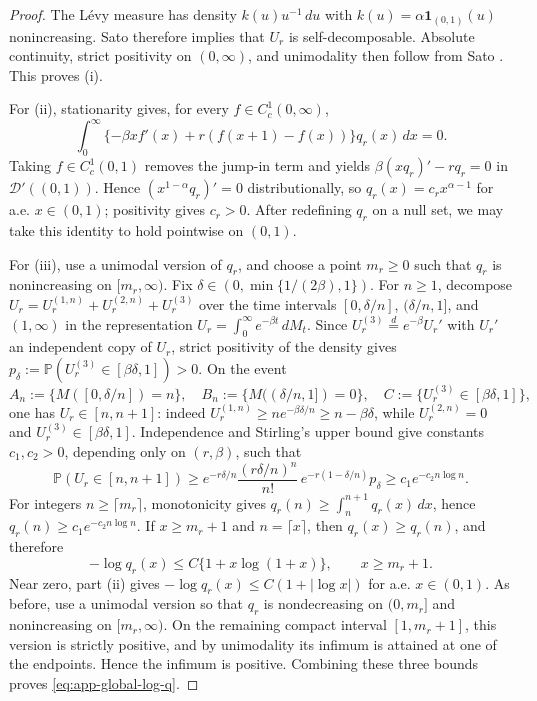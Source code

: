 \documentclass{article}
\newcommand{\Pbb}{\mathbb{P}}
\begin{document}
\begin{proof}
The L\'evy measure has density $k(u)u^{-1}\,du$ with
$k(u)=\alpha\mathbf 1_{(0,1)}(u)$ nonincreasing. Sato
\cite[Theorem~15.10 and Corollary~15.11]{sato1999levy} therefore implies
that $U_r$ is self-decomposable. Absolute continuity, strict positivity on
$(0,\infty)$, and unimodality then follow from Sato
\cite[Theorem~27.13, Lemma~53.1, and Theorem~53.1]{sato1999levy}. This proves
(i).

For (ii), stationarity gives, for every $f\in C_c^1(0,\infty)$,
\[
\int_0^\infty \{ -\beta x f'(x)+r(f(x+1)-f(x)) \}q_r(x)\,dx=0.
\]
Taking $f\in C_c^1(0,1)$ removes the jump-in term and yields
$\beta(xq_r)'-rq_r=0$ in $\mathcal D'((0,1))$. Hence
$(x^{1-\alpha}q_r)'=0$ distributionally, so
$q_r(x)=c_r x^{\alpha-1}$ for a.e. $x\in(0,1)$; positivity gives $c_r>0$.
After redefining \(q_r\) on a null set, we may take this identity to hold
pointwise on \((0,1)\).

For (iii), use a unimodal version of $q_r$, and choose a point $m_r\ge0$ such
that $q_r$ is nonincreasing on $[m_r,\infty)$. Fix
$\delta\in(0,\min\{1/(2\beta),1\})$. For $n\ge1$, decompose
$U_r=U_r^{(1,n)}+U_r^{(2,n)}+U_r^{(3)}$ over the time intervals
$[0,\delta/n]$, $(\delta/n,1]$, and $(1,\infty)$ in the representation
$U_r=\int_0^\infty e^{-\beta t}\,dM_t$. Since
$U_r^{(3)}\stackrel d=e^{-\beta}U_r'$ with $U_r'$ an independent copy of
$U_r$, strict positivity of the density gives
$p_\delta:=\Pbb(U_r^{(3)}\in[\beta\delta,1])>0$. On the event
\[
A_n:=\{M([0,\delta/n])=n\},\quad
B_n:=\{M((\delta/n,1])=0\},\quad
C:=\{U_r^{(3)}\in[\beta\delta,1]\},
\]
one has $U_r\in[n,n+1]$: indeed
$U_r^{(1,n)}\ge n e^{-\beta\delta/n}\ge n-\beta\delta$, while
$U_r^{(2,n)}=0$ and $U_r^{(3)}\in[\beta\delta,1]$. Independence and Stirling's
upper bound give constants $c_1,c_2>0$, depending only on $(r,\beta)$, such
that
\[
\Pbb(U_r\in[n,n+1])
\ge e^{-r\delta/n}\frac{(r\delta/n)^n}{n!}\,e^{-r(1-\delta/n)}p_\delta
\ge c_1 e^{-c_2 n\log n}.
\]
For integers $n\ge\lceil m_r\rceil$, monotonicity gives
$q_r(n)\ge\int_n^{n+1}q_r(x)\,dx$, hence
$q_r(n)\ge c_1e^{-c_2n\log n}$. If $x\ge m_r+1$ and $n=\lceil x\rceil$, then
$q_r(x)\ge q_r(n)$, and therefore
\[
-\log q_r(x)\le C\{1+x\log(1+x)\},\qquad x\ge m_r+1.
\]
Near zero, part (ii) gives
$-\log q_r(x)\le C(1+|\log x|)$ for a.e. $x\in(0,1)$. 
As before, use a unimodal version so that \(q_r\) is nondecreasing on \((0,m_r]\)
and nonincreasing on \([m_r,\infty)\). On the remaining compact interval
\([1,m_r+1]\), this version is strictly positive, and by unimodality its
infimum is attained at one of the endpoints. Hence the infimum is positive.
Combining these three bounds proves \eqref{eq:app-global-log-q}.


\end{proof}
\end{document}
